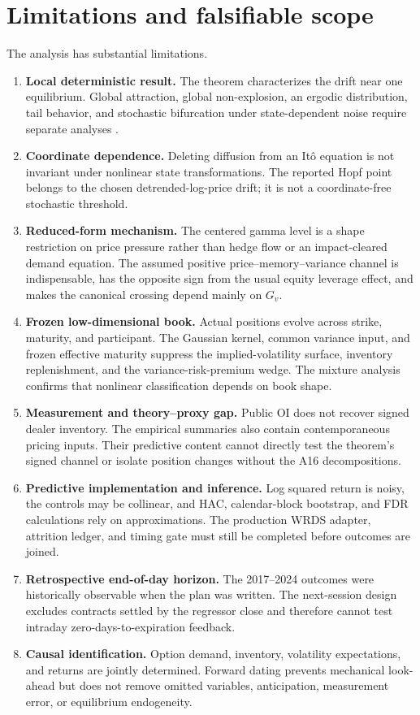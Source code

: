 \documentclass[11pt]{article}
\begin{document}
\section{Limitations and falsifiable scope}
\label{sec:limitations}

The analysis has substantial limitations.
\begin{enumerate}
\item \textbf{Local deterministic result.}  The theorem characterizes the drift near one
equilibrium.  Global attraction, global non-explosion, an ergodic distribution, tail
behavior, and stochastic bifurcation under state-dependent noise require separate analyses
\citep{baxendale1994,baxendale2025}.
\item \textbf{Coordinate dependence.}  Deleting diffusion from an It\^o equation is not
invariant under nonlinear state transformations.  The reported Hopf point belongs to the
chosen detrended-log-price drift; it is not a coordinate-free stochastic threshold.
\item \textbf{Reduced-form mechanism.}  The centered gamma level is a shape restriction on
price pressure rather than hedge flow or an impact-cleared demand equation.  The assumed
positive price--memory--variance channel is indispensable, has the opposite sign from the
usual equity leverage effect, and makes the canonical crossing depend mainly on $G_v$.
\item \textbf{Frozen low-dimensional book.}  Actual positions evolve across strike,
maturity, and participant.  The Gaussian kernel, common variance input, and frozen effective
maturity suppress the implied-volatility surface, inventory replenishment, and the
variance-risk-premium wedge.  The mixture analysis confirms that nonlinear classification
depends on book shape.
\item \textbf{Measurement and theory--proxy gap.}  Public OI does not recover signed dealer
inventory.  The empirical summaries also contain contemporaneous pricing inputs.  Their
predictive content cannot directly test the theorem's signed channel or isolate position
changes without the A16 decompositions.
\item \textbf{Predictive implementation and inference.}  Log squared return is noisy, the
controls may be collinear, and HAC, calendar-block bootstrap, and FDR calculations rely on
approximations.  The production WRDS adapter, attrition ledger, and timing gate must still be
completed before outcomes are joined.
\item \textbf{Retrospective end-of-day horizon.}  The 2017--2024 outcomes were historically
observable when the plan was written.  The next-session design excludes contracts settled
by the regressor close and therefore cannot test intraday zero-days-to-expiration feedback.
\item \textbf{Causal identification.}  Option demand, inventory, volatility expectations,
and returns are jointly determined.  Forward dating prevents mechanical look-ahead but does
not remove omitted variables, anticipation, measurement error, or equilibrium endogeneity.
\end{enumerate}
\end{document}
